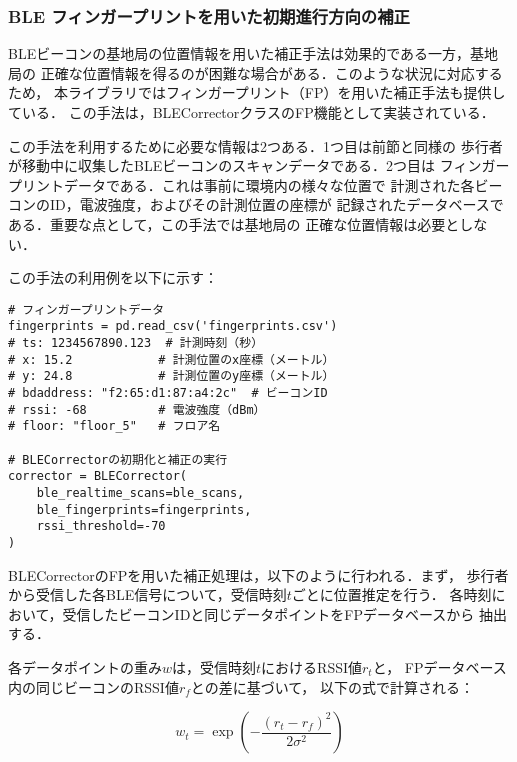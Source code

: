 
\subsubsection{BLE フィンガープリントを用いた初期進行方向の補正}

BLEビーコンの基地局の位置情報を用いた補正手法は効果的である一方，基地局の
正確な位置情報を得るのが困難な場合がある．このような状況に対応するため，
本ライブラリではフィンガープリント（FP）を用いた補正手法も提供している．
この手法は，BLECorrectorクラスのFP機能として実装されている．

この手法を利用するために必要な情報は2つある．1つ目は前節と同様の
歩行者が移動中に収集したBLEビーコンのスキャンデータである．2つ目は
フィンガープリントデータである．これは事前に環境内の様々な位置で
計測された各ビーコンのID，電波強度，およびその計測位置の座標が
記録されたデータベースである．重要な点として，この手法では基地局の
正確な位置情報は必要としない．

この手法の利用例を以下に示す：


\begin{lstlisting}[caption={BLECorrectorの使用例},label=lst:rotate-trajectory-using-ble-fingerprint,float=ht]
# フィンガープリントデータ
fingerprints = pd.read_csv('fingerprints.csv')
# ts: 1234567890.123  # 計測時刻（秒）
# x: 15.2            # 計測位置のx座標（メートル）
# y: 24.8            # 計測位置のy座標（メートル）
# bdaddress: "f2:65:d1:87:a4:2c"  # ビーコンID
# rssi: -68          # 電波強度（dBm）
# floor: "floor_5"   # フロア名

# BLECorrectorの初期化と補正の実行
corrector = BLECorrector(
    ble_realtime_scans=ble_scans,
    ble_fingerprints=fingerprints,
    rssi_threshold=-70
)
\end{lstlisting}


BLECorrectorのFPを用いた補正処理は，以下のように行われる．まず，
歩行者から受信した各BLE信号について，受信時刻$t$ごとに位置推定を行う．
各時刻において，受信したビーコンIDと同じデータポイントをFPデータベースから
抽出する．

各データポイントの重み$w$は，受信時刻$t$におけるRSSI値$r_t$と，
FPデータベース内の同じビーコンのRSSI値$r_f$との差に基づいて，
以下の式で計算される：

\begin{equation}
w_t = \exp\left(-\frac{(r_t - r_f)^2}{2\sigma^2}\right)
\end{equation}

